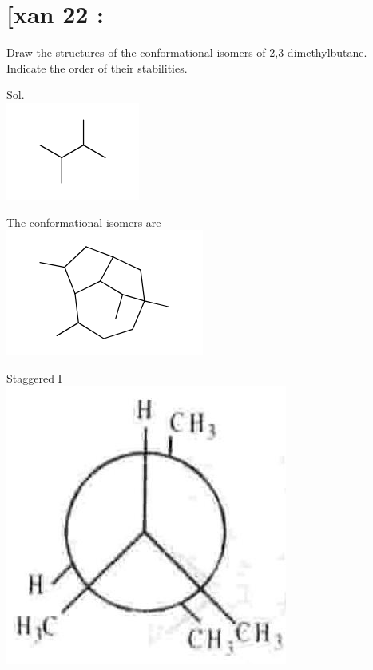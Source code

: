 \documentclass[10pt]{article}
\begin{document}
\section*{[xan 22 :}
Draw the structures of the conformational isomers of 2,3-dimethylbutane. Indicate the order of their stabilities.

Sol.\\
\includegraphics{smile-5aac42685bf10063f1f76889c67c41c30664a74d}

The conformational isomers are\\
\includegraphics{smile-b2cac97eb3946c777707d7573e0505b88fbf5df5}

Staggered I\\
\includegraphics[max width=\textwidth, center]{2025_01_28_8470952b98110cec3aabg-122(1)}
\end{document}
